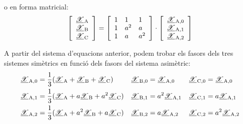 o en forma matricial:
\begin{equation}\label{eq:c_sim_mat}
   \begin{bmatrix}\begin{array}{c} 
     \cmplx{\mathscr{X}}\ped{A} \\
     \cmplx{\mathscr{X}}\ped{B} \\
     \cmplx{\mathscr{X}}\ped{C}
   \end{array}\end{bmatrix} =
   \begin{bmatrix}\begin{array}{lll} 
     1 & 1 & 1 \\
     1 & a^2 & a\\
     1 & a & a^2
   \end{array}\end{bmatrix} \cdot
   \begin{bmatrix}\begin{array}{c} 
     \cmplx{\mathscr{X}}\ped{A,0} \\
     \cmplx{\mathscr{X}}\ped{A,1} \\
     \cmplx{\mathscr{X}}\ped{A,2}
   \end{array}\end{bmatrix}
\end{equation}

A partir del sistema d'equacions anterior, podem trobar els fasors
dels tres sistemes simètrics en funció dels fasors del sistema
asimètric:
\begin{subequations}
\begin{align}
   \cmplx{\mathscr{X}}\ped{A,0} &= \frac{1}{3} (\cmplx{\mathscr{X}}\ped{A} + \cmplx{\mathscr{X}}\ped{B} +
   \cmplx{\mathscr{X}}\ped{C}) & \cmplx{\mathscr{X}}\ped{B,0} &= \cmplx{\mathscr{X}}\ped{A,0} &
   \cmplx{\mathscr{X}}\ped{C,0} &= \cmplx{\mathscr{X}}\ped{A,0}
   \label{eq:c_sim_c2}\\
   \cmplx{\mathscr{X}}\ped{A,1} &= \frac{1}{3} (\cmplx{\mathscr{X}}\ped{A} + a \cmplx{\mathscr{X}}\ped{B} +
   a^2 \cmplx{\mathscr{X}}\ped{C}) & \cmplx{\mathscr{X}}\ped{B,1} &= a^2 \cmplx{\mathscr{X}}\ped{A,1} &
   \cmplx{\mathscr{X}}\ped{C,1} &= a \cmplx{\mathscr{X}}\ped{A,1} \label{eq:c_sim_a2} \\
   \cmplx{\mathscr{X}}\ped{A,2} &= \frac{1}{3} (\cmplx{\mathscr{X}}\ped{A} + a^2 \cmplx{\mathscr{X}}\ped{B} +
   a \cmplx{\mathscr{X}}\ped{C}) & \cmplx{\mathscr{X}}\ped{B,2} &= a \cmplx{\mathscr{X}}\ped{A,2} &
   \cmplx{\mathscr{X}}\ped{C,2} &= a^2 \cmplx{\mathscr{X}}\ped{A,2} \label{eq:c_sim_b2}
\end{align}
\end{subequations}

